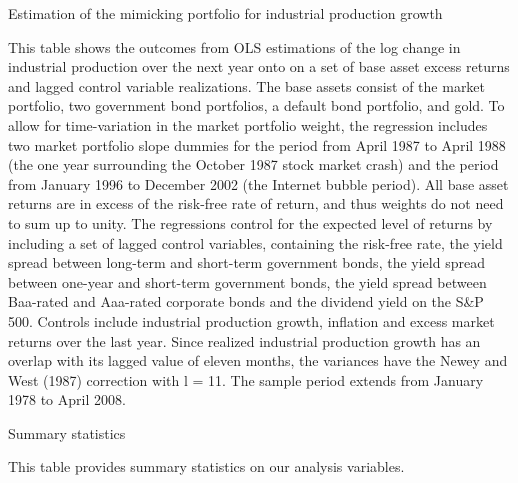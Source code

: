 \documentclass[12pt,a4paper]{ouparticle}
\begin{document}
\begin{table}
  \begin{threeparttable}
    \caption{Estimation of the mimicking portfolio for industrial production growth}
    
    \begin{tablenotes} 
    \small 
    \item This table shows the outcomes from OLS estimations of the log change in industrial production over the next year onto on a set of base asset excess returns and lagged control variable realizations. The base assets consist of the market portfolio, two government bond portfolios, a default bond portfolio, and gold. To allow for time-variation in the market portfolio weight, the regression includes two market portfolio slope dummies for the period from April 1987 to April 1988 (the one year surrounding the October 1987 stock market crash) and the period from January 1996 to December 2002 (the Internet bubble period). All base asset returns are in excess of the risk-free rate of return, and thus weights do not need to sum up to unity. The regressions control for the expected level of returns by including a set of lagged control variables, containing the risk-free rate, the yield spread between long-term and short-term government bonds, the yield spread between one-year and short-term government bonds, the yield spread between Baa-rated and Aaa-rated corporate bonds and the dividend yield on the S\&P 500. Controls include industrial production growth, inflation and excess market returns over the last year. Since realized industrial production growth has an overlap with its lagged value of eleven months, the variances have the Newey and West (1987) correction with l = 11. The sample period extends from January 1978 to April 2008.
    \end{tablenotes}
  \end{threeparttable}
\end{table}

\begin{sidewaystable}
  \begin{threeparttable}
    \caption{Summary statistics}
    
    \begin{tablenotes} 
    \small 
    \item This table provides summary statistics on our analysis variables.
    \end{tablenotes}
  \end{threeparttable}
\end{sidewaystable}
\end{document}
